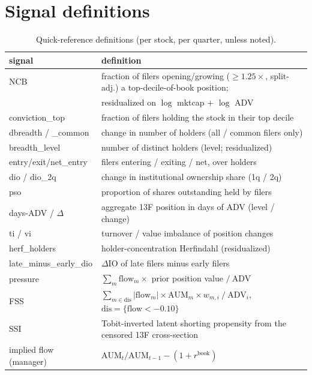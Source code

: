 \section{Signal definitions}
\label{app:defs}

\begin{table}[h]
\centering\scriptsize
\caption{Quick-reference definitions (per stock, per quarter, unless
noted).}
\begin{tabular}{ll}
\toprule
signal & definition \\
\midrule
NCB & fraction of filers opening/growing ($\ge1.25\times$, split-adj.)
a top-decile-of-book position; \\
& residualized on $\log$ mktcap $+$ $\log$ ADV \\
conviction\_top & fraction of filers holding the stock in their top
decile \\
dbreadth / \_common & change in number of holders (all / common
filers only) \\
breadth\_level & number of distinct holders (level; residualized) \\
entry/exit/net\_entry & filers entering / exiting / net, over holders \\
dio / dio\_2q & change in institutional ownership share (1q / 2q) \\
pso & proportion of shares outstanding held by filers \\
days-ADV / $\Delta$ & aggregate 13F position in days of ADV (level /
change) \\
ti / vi & turnover / value imbalance of position changes \\
herf\_holders & holder-concentration Herfindahl (residualized) \\
late\_minus\_early\_dio & $\Delta$IO of late filers minus early
filers \\
pressure & $\sum_m \mathrm{flow}_m \times$ prior position value
$/\ \mathrm{ADV}$ \\
FSS & $\sum_{m\in\mathrm{dis}} |\mathrm{flow}_m| \times
\mathrm{AUM}_m \times w_{m,i} \ /\ \mathrm{ADV}_i$,\quad
$\mathrm{dis}=\{\mathrm{flow}<-0.10\}$ \\
SSI & Tobit-inverted latent shorting propensity from the censored 13F
cross-section \\
implied flow (manager) & $\mathrm{AUM}_t/\mathrm{AUM}_{t-1} - (1 +
r^{\text{book}})$ \\
\bottomrule
\end{tabular}
\end{table}
